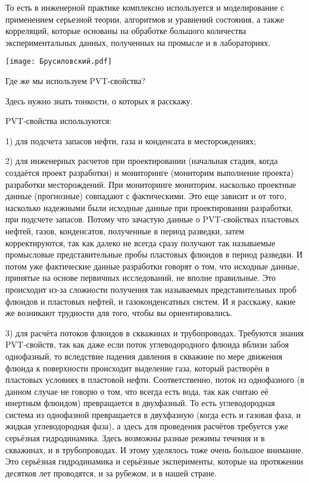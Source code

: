 \documentclass[main.tex]{subfiles}
\begin{document}
То есть в инженерной практике комплексно используется и моделирование с применением серьезной теории, алгоритмов и уравнений состояния, а также корреляций, которые основаны на обработке большого количества экспериментальных данных, полученных на промысле и в лабораториях.

\begin{center}
\texttt{[image: Брусиловский.pdf]}
\end{center}

Где же мы используем PVT-свойства?

Здесь нужно знать тонкости, о которых я расскажу.

PVT-свойства используются:

1) для подсчета запасов нефти, газа и конденсата в месторождениях;

2) для инженерных расчетов при проектировании (начальная стадия, когда создаётся проект разработки) и мониторинге (мониторим выполнение проекта) разработки месторождений.
При мониторинге мониторим, насколько проектные данные (прогнозные) совпадают с фактическими.
Это еще зависит и от того, насколько надежными были исходные данные при проектировании разработки, при подсчете запасов.
Потому что зачастую данные о PVT-свойствах пластовых нефтей, газов, конденсатов, полученные в период разведки, затем корректируются, так как далеко не всегда сразу получают так называемые промысловые представительные пробы пластовых флюидов в период разведки.
И потом уже фактические данные разработки говорят о том, что исходные данные, принятые на основе первичных исследований, не вполне правильные.
Это происходит из-за сложности получения так называемых представительных проб флюидов и пластовых нефтей, и газоконденсатных систем.
И я расскажу, какие же возникают трудности для того, чтобы вы ориентировались. 

3) для расчёта потоков флюидов в скважинах и трубопроводах.
Требуются знания PVT-свойств, так как даже если поток углеводородного флюида вблизи забоя однофазный, то вследствие падения давления в скважине по мере движения флюида к поверхности происходит выделение газа, который растворён в пластовых условиях в пластовой нефти.
Соответственно, поток из однофазного (в данном случае не говорю о том, что всегда есть вода, так как считаю её инертным флюидом) превращается в двухфазный.
То есть углеводородная система из однофазной превращается в двухфазную (когда есть и газовая фаза, и жидкая углеводородная фаза), а здесь для проведения расчётов требуется уже серьёзная гидродинамика.
Здесь возможны разные режимы течения и в скважинах, и в трубопроводах.
И этому уделялось тоже очень большое внимание.
Это серьёзная гидродинамика и серьёзные эксперименты, которые на протяжении десятков лет проводятся, и за рубежом, и в нашей стране.
\end{document}
